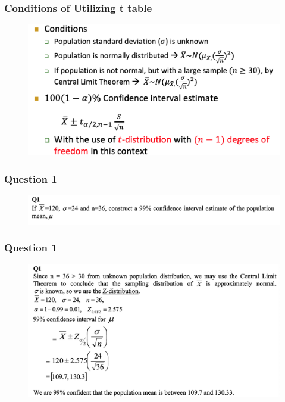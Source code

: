 \documentclass{beamer}
\begin{document}
\begin{frame}
\frametitle{Conditions of Utilizing t table}
\begin{figure}
	\begin{center}
		\includegraphics[scale=0.40]{recap3.png}
	\end{center}
\end{figure}
\end{frame}

\begin{frame}
\frametitle{Question 1}

\begin{figure}
	\begin{center}
		\includegraphics[scale=0.30]{Q1.png}
	\end{center}
\end{figure}
\end{frame}
\begin{frame}
\frametitle{Question 1}
\begin{figure}
	\begin{center}
		\includegraphics[scale=0.30]{Q1_sol.png}
	\end{center}
\end{figure}
\end{frame}
\end{document}
